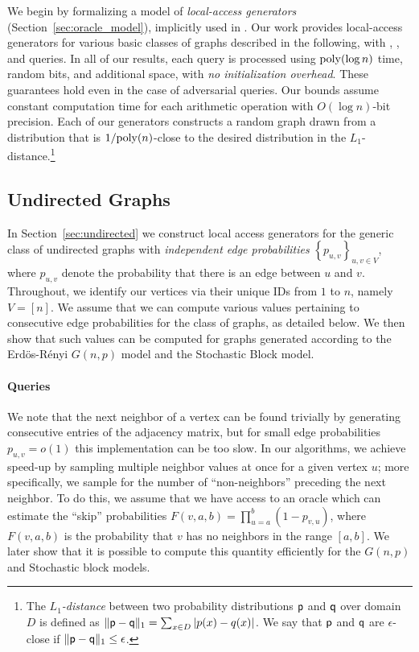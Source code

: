 We begin by formalizing a model of {\em local-access generators}
(Section~\ref{sec:oracle_model}), implicitly used in \cite{reut}.
Our work provides local-access generators for various
basic classes of graphs described in the following, with 
, , and 
queries.  In all of our results,
each query is processed using $\mathrm{poly}(\log n)$
time, random bits, and additional space, with \emph{no initialization overhead}.
These guarantees hold even in the case of adversarial queries.
Our bounds assume constant computation time for each arithmetic operation with
$O(\log n)$-bit precision. Each of our generators constructs a random graph
drawn from a distribution that is $1/\mathrm{poly}(n)$-close
to the desired distribution in the $L_1$-distance.\footnote{The \emph{$L_1$-distance} between two probability distributions $\mathsf{p}$
and $\mathsf{q}$ over domain $D$ is defined as $\|\mathsf{p-q}\|_1 = 
\sum_{x \in D } |p(x)-q(x)|$.
We say that $\mathsf{p}$ and $\mathsf{q}$ are $\epsilon$-close if $\|\mathsf{p-q}\|_1 \leq \epsilon$.
}



\subsection{Undirected Graphs}
\label{sec:undirected_graphs}
In Section~\ref{sec:undirected} we construct local access generators for the generic
class of undirected graphs
with {\em independent edge probabilities} $\left\{ p_{u,v} \right\}_{u,v\in V}$,
where $p_{u,v}$ denote the probability that there is an edge between $u$ and $v$.
Throughout, we identify our vertices via their unique IDs from $1$ to $n$, namely $V = [n]$.
We assume that we can compute various values pertaining to consecutive
edge probabilities for the class of graphs, as detailed below.
We then show that such values can be computed for graphs
generated according to the Erd\"{o}s-R\'{e}nyi $G(n,p)$ model
and the Stochastic Block model.

\paragraph*{ Queries}
\label{par:next_neighbor_queries}
We note that the next neighbor of a vertex can be found trivially by generating consecutive
entries of the adjacency matrix, but for small edge probabilities $p_{u,v} = o(1)$
this implementation can be too slow.  In our algorithms, we achieve speed-up by sampling multiple 
neighbor values at once for a given vertex $u$; more specifically,  
we sample for the number of ``non-neighbors'' preceding
the next neighbor.
To do this, we assume that we have access to
an oracle which can estimate the ``skip'' probabilities 
$F(v,a,b)=\prod^{b}_{u=a} (1-p_{v,u})$,
where $F(v,a,b)$ is the probability that $v$ 
has no neighbors in the range $[a,b]$.
We later show that it is possible to compute this quantity efficiently
for the $G(n,p)$ and Stochastic block models.

